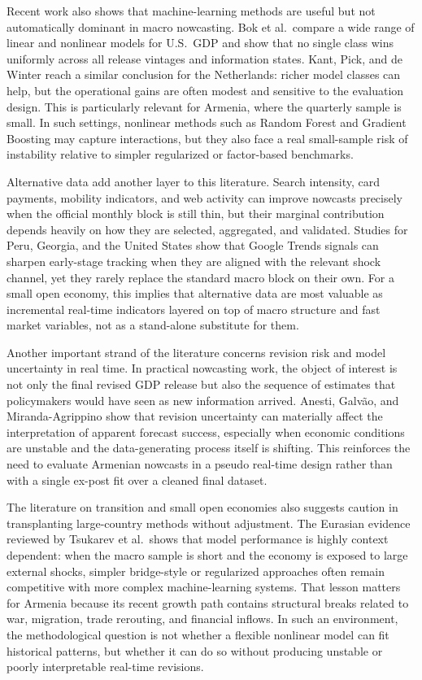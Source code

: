 \documentclass[12pt,a4paper]{report}
\begin{document}
Recent work also shows that machine-learning methods are useful but not automatically dominant in macro nowcasting. Bok et al.\ compare a wide range of linear and nonlinear models for U.S.\ GDP and show that no single class wins uniformly across all release vintages and information states.\citep{Bok2017} Kant, Pick, and de Winter reach a similar conclusion for the Netherlands: richer model classes can help, but the operational gains are often modest and sensitive to the evaluation design.\citep{NetherlandsDNB2022} This is particularly relevant for Armenia, where the quarterly sample is small. In such settings, nonlinear methods such as Random Forest and Gradient Boosting may capture interactions, but they also face a real small-sample risk of instability relative to simpler regularized or factor-based benchmarks.

Alternative data add another layer to this literature. Search intensity, card payments, mobility indicators, and web activity can improve nowcasts precisely when the official monthly block is still thin, but their marginal contribution depends heavily on how they are selected, aggregated, and validated. Studies for Peru, Georgia, and the United States show that Google Trends signals can sharpen early-stage tracking when they are aligned with the relevant shock channel, yet they rarely replace the standard macro block on their own.\citep{Peru2024,Georgia2022,US2022} For a small open economy, this implies that alternative data are most valuable as incremental real-time indicators layered on top of macro structure and fast market variables, not as a stand-alone substitute for them.

Another important strand of the literature concerns revision risk and model uncertainty in real time. In practical nowcasting work, the object of interest is not only the final revised GDP release but also the sequence of estimates that policymakers would have seen as new information arrived. Anesti, Galv\~{a}o, and Miranda-Agrippino show that revision uncertainty can materially affect the interpretation of apparent forecast success, especially when economic conditions are unstable and the data-generating process itself is shifting.\citep{Anesti2020} This reinforces the need to evaluate Armenian nowcasts in a pseudo real-time design rather than with a single ex-post fit over a cleaned final dataset.

The literature on transition and small open economies also suggests caution in transplanting large-country methods without adjustment. The Eurasian evidence reviewed by Tsukarev et al.\ shows that model performance is highly context dependent: when the macro sample is short and the economy is exposed to large external shocks, simpler bridge-style or regularized approaches often remain competitive with more complex machine-learning systems.\citep{ArmeniaBelarus2024} That lesson matters for Armenia because its recent growth path contains structural breaks related to war, migration, trade rerouting, and financial inflows. In such an environment, the methodological question is not whether a flexible nonlinear model can fit historical patterns, but whether it can do so without producing unstable or poorly interpretable real-time revisions.
\end{document}
